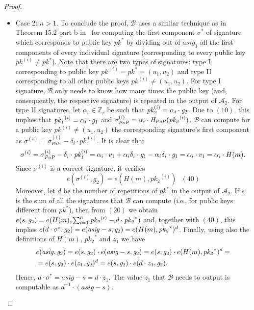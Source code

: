 \begin{proof}
\begin{itemize}
\item Case 2: $ n > 1$. To conclude the proof, $\mathcal{B}$ uses a similar technique 
as in Theorem 15.2 part b in~\cite{dabo_book} for computing the first component $\sigma^*$ of signature 
which corresponds to public key $\mathit{pk}^*$ by dividing out of $\mathit{asig_1}$ all the first components of every 
individual signature (corresponding to every public key $\mathit{pk^{(i)}} \neq \mathit{pk^*}$). Note that  
there are two types of signatures: type I corresponding to public key $\mathit{pk^{(i)}} =  \mathit{pk^*} = (u_1, u_2)$ and type II
corresponding to all other public keys $\mathit{pk^{(i)}} \neq (u_1, u_2)$. For type I signature, $\mathcal{B}$
only needs to know how many times the public key (and, consequently, the respective signature) is repeated in the output of $\mathcal{A}_2$. 
For type II signatures, let $\alpha_i \in \mathbb{Z}_r$ be such that $\mathit{pk}_2^{(i)} = \alpha_i \cdot \mathit{g}_{2}$. Due to $(10)$, this implies 
that $\mathit{pk_1}^{(i)} = \alpha_i \cdot \mathit{g}_{1}$ and 
$\sigma_{\mathit{PoP}}^{(i)} = \alpha_i \cdot \mathit{H}_{\mathit{PoP}}(\mathit{pk_2}^{(i)})$. $\mathcal{B}$ can compute for a public key $\mathit{pk^{(i)}} \neq (u_1, u_2)$ 
the corresponding signature's first component as $\sigma^{(i)} = \sigma_{\mathit{PoP}}^{(i)} - \delta_i \cdot \mathit{pk_1^{(i)}}$. It is clear that 
$$\sigma^{(i)} = \sigma_{\mathit{PoP}}^{(i)} - \delta_i \cdot \mathit{pk_1^{(i)}} = \alpha_i \cdot v_1 + \alpha_i \delta_i \cdot \mathit{g}_{1} - 
\alpha_i \delta_i \cdot \mathit{g}_{1} =  \alpha_i \cdot v_1  = \alpha_i \cdot H(m).$$
\noindent Since $\sigma^{(i)}$ is a correct signature, it verifies $$e(\sigma^{(i)}, g_2) = e(H(m), \mathit{pk_2}^{(i)}) \ \ \ (40)$$ 
Moreover, let $d$ be the number of repetitions of $\mathit{pk}^{*}$ in the output of $\mathcal{A}_2$. 
If $s$ is the sum of all the signatures that $\mathcal{B}$ can compute 
(i.e., for public keys different from $\mathit{pk}^{*}$), then from $(20)$ we obtain 
$e(s,\mathit{g}_{2}) = e(H(m), \sum_{i=1}^n \mathit{pk_2}^{(i)} - d \cdot \mathit{pk_2}^{*})$ and, together with $(40)$, this implies 
$e(d \cdot \sigma^{*}, \mathit{g}_{2}) = e(\mathit{asig} - s, \mathit{g}_{2}) = e(H(m), \mathit{pk_2}^{*})^d$.
Finally, using also the definitions of $H(m)$, $\mathit{pk_2}^{\ast}$ and $z_1$ we have 
\begin{align*}
& e(\mathit{asig}, \mathit{g}_{2}) = e(s, \mathit{g}_{2}) \cdot e(\mathit{asig} - s, \mathit{g}_{2}) = e(s, \mathit{g}_{2}) \cdot e(H(m), \mathit{pk_2}^{*})^d =  \\
& = e(s, \mathit{g}_{2}) \cdot e(z_1, \mathit{g}_{2})^{d} = e(s, \mathit{g}_{2}) \cdot e(d \cdot z_1, \mathit{g}_{2}).  
\end{align*} 
\noindent Hence, $ d \cdot \sigma^{*} = \mathit{asig} - s = d \cdot z_1$. The value $z_1$ that $\mathcal{B}$ 
needs to output is computable as $d^{-1} \cdot (\mathit{asig} - s)$. 
\end{itemize}
\end{proof}